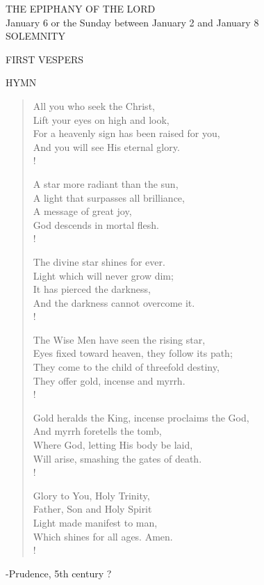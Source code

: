 \begin{center}\normalsize THE EPIPHANY OF THE LORD\\
\footnotesize January 6 or the Sunday between January 2 and January 8\\
\footnotesize SOLEMNITY\\
\end{center}

\begin{flushleft}\normalsize FIRST VESPERS\\\end{flushleft}

\noindent\small{\uppercase{Hymn }}\normalsize\label{epiphany:hymn}
\begin{verse}
All you who seek the Christ,\\
Lift your eyes on high and look,\\
For a heavenly sign has been raised for you,\\
And you will see His eternal glory.\\!

A star more radiant than the sun,\\
A light that surpasses all brilliance,\\
A message of great joy,\\
God descends in mortal flesh.\\!

The divine star shines for ever.\\
Light which will never grow dim;\\
It has pierced the darkness,\\
And the darkness cannot overcome it.\\!

The Wise Men have seen the rising star,\\
Eyes fixed toward heaven, they follow its path;\\
They come to the child of threefold destiny,\\
They offer gold, incense and myrrh.\\!

Gold heralds the King, incense proclaims the God,\\
And myrrh foretells the tomb,\\
Where God, letting His body be laid,\\
Will arise, smashing the gates of death.\\!

Glory to You, Holy Trinity,\\
Father, Son and Holy Spirit\\
Light made manifest to man,\\
Which shines for all ages. Amen.\\!
\end{verse}
\begin{flushright}\tiny -Prudence, 5th century ?\end{flushright}

